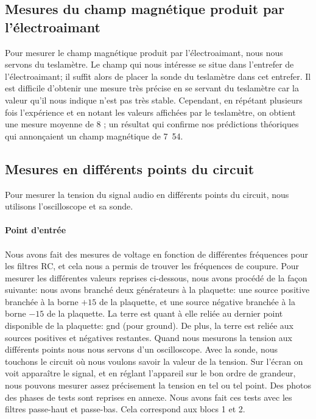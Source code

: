 \subsection{Mesures du champ magnétique produit par l'électroaimant}
Pour mesurer le champ magnétique produit par l'électroaimant, nous nous servons du teslamètre.
Le champ qui nous intéresse se situe dans l'entrefer de l'électroaimant; il suffit alors de placer
la sonde du teslamètre dans cet entrefer. Il est difficile d'obtenir une mesure très précise en se
servant du teslamètre car la valeur qu'il nous indique n'est pas très stable. Cependant, en répétant
plusieurs fois l'expérience et en notant les valeurs affichées par le teslamètre, on obtient une mesure
moyenne de \unit{8}{\centi\tesla} ; un résultat qui confirme nos prédictions théoriques
qui annonçaient un champ magnétique de \unit{7.54}{\centi\tesla}.

\subsection{Mesures en différents points du circuit}
Pour mesurer la tension du signal audio en différents points du circuit, nous utilisons l'oscilloscope
et sa sonde.

\paragraph{Point d'entrée}

\paragraph{}


Nous avons fait des mesures de voltage en fonction de différentes fréquences pour les filtres RC, et cela nous a permis
de trouver les fréquences de coupure. Pour mesurer les différentes valeurs reprises ci-dessous, nous avons procédé de la
façon suivante: nous avons branché deux générateurs à la plaquette: une source positive branchée à la borne $+15$ de la plaquette, et
une source négative branchée à la borne $-15$ de la plaquette. La terre est quant à elle reliée au dernier point
disponible de la plaquette: gnd (pour ground). De plus, la terre est reliée aux sources positives et négatives
restantes. Quand nous mesurons la tension aux différents points nous nous servons d'un oscilloscope. Avec la sonde,
nous touchons le circuit où nous voulons savoir la valeur de la tension. Sur l'écran on voit apparaître le
signal, et en réglant l'appareil sur le bon ordre de grandeur, nous pouvons mesurer assez précisement la tension en
tel ou tel point. Des photos des phases de tests sont reprises en annexe.
  Nous avons fait ces tests avec les filtres
passe-haut et passe-bas. Cela correspond aux blocs 1 et 2.

